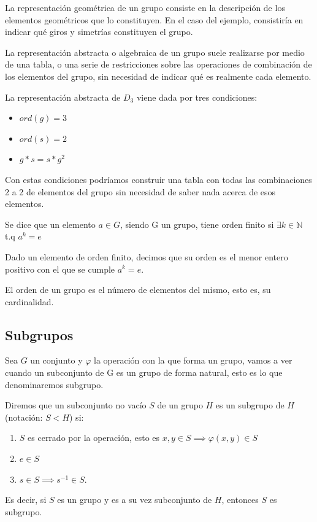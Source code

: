 \documentclass{apuntes}
\begin{document}
 La representación geométrica de un grupo consiste en la descripción de los elementos geométricos que lo constituyen. En el caso del ejemplo, consistiría en indicar qué giros y simetrías constituyen el grupo.
 
 La representación abstracta o algebraica de un grupo suele realizarse por medio de una tabla, o una serie de restricciones sobre las operaciones de combinación de los elementos del grupo, sin necesidad de indicar qué es realmente cada elemento.
 \begin{example}
  La representación abstracta de $D_{3}$  viene dada por tres condiciones:
 \begin{itemize}
  \item $ord(g)=3$
  \item $ord(s)=2$
  \item $g\ast s=s\ast g^{2}$
 \end{itemize}
 
Con estas condiciones podríamos construir una tabla con todas las combinaciones 2 a 2 de elementos del grupo sin necesidad
 de saber nada acerca de esos elementos.
 \end{example}
 
 \begin{defn}
  Se dice que un elemento $a\in G$, siendo G un grupo, tiene orden finito si $\exists k\in\mathbb{N}$  t.q  $a^{k}=e$
 \end{defn}
 
 \begin{defn}
  Dado un elemento de orden finito, decimos que su orden es el menor entero positivo con el que se cumple $a^{k}=e$.
 \end{defn}
 
 \begin{defn}
 El orden de un grupo es el número de elementos del mismo, esto es, su cardinalidad.
 \end{defn}
 
\subsection{Subgrupos}
 Sea $G$ un conjunto y $\varphi$  la operación con la que forma un grupo, vamos a ver cuando un subconjunto de G es un grupo de forma natural,
 esto es lo que denominaremos subgrupo.
 
 \begin{defn}[Subgrupo]
  Diremos que un subconjunto no vacío $S$ de un grupo $H$ es un subgrupo de $H$ (notación: $S < H$) si:
  \begin{enumerate}
   \item $S$ es cerrado por la operación, esto es $x,y \in S \implies \varphi(x,y) \in S$
   \item $e \in S$
   \item $s \in S \implies s^{-1}\in S$.
  \end{enumerate}
  
  Es decir, si $S$ es un grupo y es a su vez subconjunto de $H$, entonces $S$ es subgrupo.
 \end{defn}
 
\end{document}
